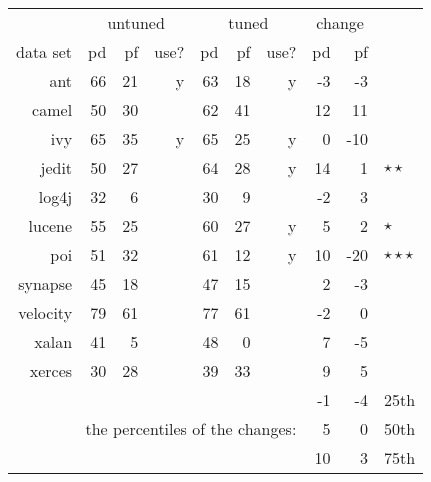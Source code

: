      {\scriptsize
\begin{tabular}{r|rrr|rrr|rr|l}
  & \multicolumn{3}{c|}{untuned} & \multicolumn{3}{c|}{tuned} & \multicolumn{2}{c|}{change}\\
  \cline{2-9}
data set & pd & pf & use? & pd & pf & use? & pd & pf\\\cline{1-9}
ant & 66 & 21 & y & 63 & 18 & y & -3 & -3\\
camel & 50 & 30 &   & 62 & 41 &   & 12 & 11\\
ivy & 65 & 35 & y & 65 & 25 & y & 0 & -10\\
jedit & 50 & 27 &   & 64 & 28 & y & 14 & 1&$\star\star$\\
log4j & 32 & 6 &   & 30 & 9 &   & -2 & 3\\
lucene & 55 & 25 &   & 60 & 27 & y & 5 & 2&$\star$\\
poi & 51 & 32 &   & 61 & 12 & y & 10 & -20&$\star\star\star$\\
synapse & 45 & 18 &   & 47 & 15 &   & 2 & -3\\
velocity & 79 & 61 &   & 77 & 61 &   & -2 & 0\\
xalan & 41 & 5 &   & 48 & 0 &   & 7 & -5\\
xerces & 30 & 28 &   & 39 & 33 &   & 9 & 5\\\hline
  \multicolumn{5}{c}{~} &    &  & -1 & -4& 25th\\
\multicolumn{7}{r|}{the percentiles of the changes:}      & 5 & 0 & 50th\\
 \multicolumn{5}{c}{~}  &            & & 10 & 3 & 75th\\
\end{tabular}
}
